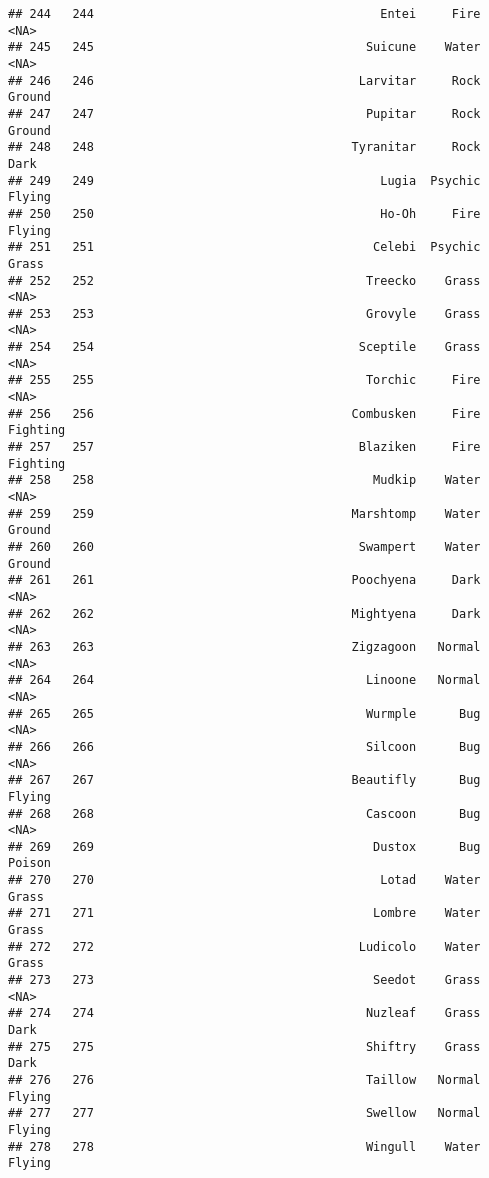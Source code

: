 \documentclass[
]{article}
\begin{document}
\begin{verbatim}
## 244   244                                        Entei     Fire     <NA>
## 245   245                                      Suicune    Water     <NA>
## 246   246                                     Larvitar     Rock   Ground
## 247   247                                      Pupitar     Rock   Ground
## 248   248                                    Tyranitar     Rock     Dark
## 249   249                                        Lugia  Psychic   Flying
## 250   250                                        Ho-Oh     Fire   Flying
## 251   251                                       Celebi  Psychic    Grass
## 252   252                                      Treecko    Grass     <NA>
## 253   253                                      Grovyle    Grass     <NA>
## 254   254                                     Sceptile    Grass     <NA>
## 255   255                                      Torchic     Fire     <NA>
## 256   256                                    Combusken     Fire Fighting
## 257   257                                     Blaziken     Fire Fighting
## 258   258                                       Mudkip    Water     <NA>
## 259   259                                    Marshtomp    Water   Ground
## 260   260                                     Swampert    Water   Ground
## 261   261                                    Poochyena     Dark     <NA>
## 262   262                                    Mightyena     Dark     <NA>
## 263   263                                    Zigzagoon   Normal     <NA>
## 264   264                                      Linoone   Normal     <NA>
## 265   265                                      Wurmple      Bug     <NA>
## 266   266                                      Silcoon      Bug     <NA>
## 267   267                                    Beautifly      Bug   Flying
## 268   268                                      Cascoon      Bug     <NA>
## 269   269                                       Dustox      Bug   Poison
## 270   270                                        Lotad    Water    Grass
## 271   271                                       Lombre    Water    Grass
## 272   272                                     Ludicolo    Water    Grass
## 273   273                                       Seedot    Grass     <NA>
## 274   274                                      Nuzleaf    Grass     Dark
## 275   275                                      Shiftry    Grass     Dark
## 276   276                                      Taillow   Normal   Flying
## 277   277                                      Swellow   Normal   Flying
## 278   278                                      Wingull    Water   Flying

\end{verbatim}
\end{document}
